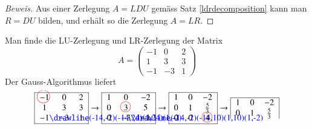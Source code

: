 \begin{proof}[Beweis]
Aus einer Zerlegung $A=LDU$ gemäss Satz \ref{ldrdecomposition} kann man
$R=DU$ bilden, und erhält so die Zerlegung $A=LR$.
\end{proof}

\begin{beispiel}
Man finde die LU-Zerlegung und LR-Zerlegung der Matrix 
\[
A=\begin{pmatrix}
-1&0&2\\
1&3&3\\
-1&-3&1
\end{pmatrix}
\]
Der Gauss-Algorithmus liefert
\begin{align*}
\begin{tabular}{|>{$}c<{$}>{$}c<{$}>{$}c<{$}|}
\hline
-1%
\begin{picture}(0,0)
\color{red}\put(-7,4){\circle{15}}
\end{picture}%
&0&2\\
1&3&3\\
-1%
\begin{picture}(0,0)
\color{blue}\drawline(-14,-2)(-14,24)(1,24)(1,-2)
\end{picture}%
&-3&1\\
\hline
\end{tabular}
\rightarrow
\begin{tabular}{|>{$}c<{$}>{$}c<{$}>{$}c<{$}|}
\hline
1&0&-2\\
0&3%
\begin{picture}(0,0)
\color{red}\put(-3,4){\circle{12}}
\end{picture}%
&5\\
0&-3%
\begin{picture}(0,0)
\color{blue}\drawline(-14,-2)(-14,10)(1,10)(1,-2)
\end{picture}%
&-1\\
\hline
\end{tabular}
\rightarrow
\begin{tabular}{|>{$}c<{$}>{$}c<{$}>{$}c<{$}|}
\hline
1&0&-2\\
0&1&\frac53\\
0&0&4%
\begin{picture}(0,0)
\color{red}\put(-3,4){\circle{12}}
\end{picture}%
\\
\hline
\end{tabular}
\rightarrow
\begin{tabular}{|>{$}c<{$}>{$}c<{$}>{$}c<{$}|}
\hline
1&0&-2\\
0&1&\frac53\\

\end{tabular}
\end{align*}
\end{beispiel}
